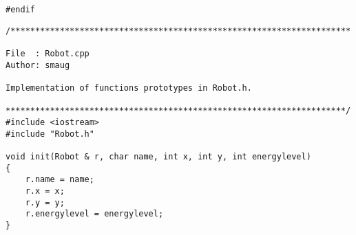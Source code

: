 {\begin{Verbatim}[frame=single]
#endif

\end{Verbatim}
\begin{Verbatim}[frame=single]
/*********************************************************************

File  : Robot.cpp
Author: smaug

Implementation of functions prototypes in Robot.h.

*********************************************************************/
#include <iostream>
#include "Robot.h"

void init(Robot & r, char name, int x, int y, int energylevel)
{
    r.name = name;
    r.x = x;
    r.y = y;
    r.energylevel = energylevel;
}

\end{Verbatim}
}

